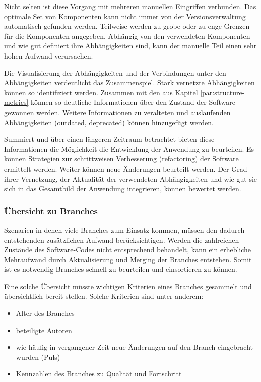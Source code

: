 Nicht selten ist diese Vorgang mit mehreren manuellen Eingriffen verbunden. Das optimale Set von Komponenten kann nicht immer von der Versionsverwaltung automatisch gefunden werden. Teilweise werden zu grobe oder zu enge Grenzen für die Komponenten angegeben. Abhängig von den verwendeten Komponenten und wie gut definiert ihre Abhängigkeiten sind, kann der manuelle Teil einen sehr hohen Aufwand verursachen.

Die Visualisierung der Abhängigkeiten und der Verbindungen unter den Abhängigkeiten verdeutlicht das Zusammenspiel. Stark vernetzte Abhängigkeiten können so identifiziert werden. Zusammen mit den  aus Kapitel \ref{par:structure-metrics} können so deutliche Informationen über den Zustand der Software gewonnen werden. Weitere Informationen zu veralteten und auslaufenden Abhängigkeiten (outdated, deprecated) können hinzugefügt werden.

Summiert und über einen längeren Zeitraum betrachtet bieten diese Informationen die Möglichkeit die Entwicklung der Anwendung zu beurteilen. Es können Strategien zur schrittweisen Verbesserung (refactoring) der Software ermittelt werden. Weiter können neue Änderungen beurteilt werden. Der Grad ihrer Vernetzung, der Aktualität der verwendeten Abhängigkeiten und wie gut sie sich in das Gesamtbild der Anwendung integrieren, können bewertet werden.

\subsubsection{Übersicht zu Branches}

Szenarien in denen viele Branches zum Einsatz kommen, müssen den dadurch entstehenden zusätzlichen Aufwand berücksichtigen. Werden die zahlreichen Zustände des Software-Codes nicht entsprechend behandelt, kann ein erhebliche Mehraufwand durch Aktualisierung und Merging der Branches entstehen. Somit ist es notwendig Branches schnell zu beurteilen und einsortieren zu können.

Eine solche Übersicht müsste wichtigen Kriterien eines Branches gesammelt und übersichtlich bereit stellen. Solche Kriterien sind unter anderem:
\begin{itemize}
\item Alter des Branches
\item beteiligte Autoren
\item wie häufig in vergangener Zeit neue Änderungen auf den Branch eingebracht wurden (Puls)
\item Kennzahlen des Branches zu Qualität und Fortschritt
\end{itemize}

